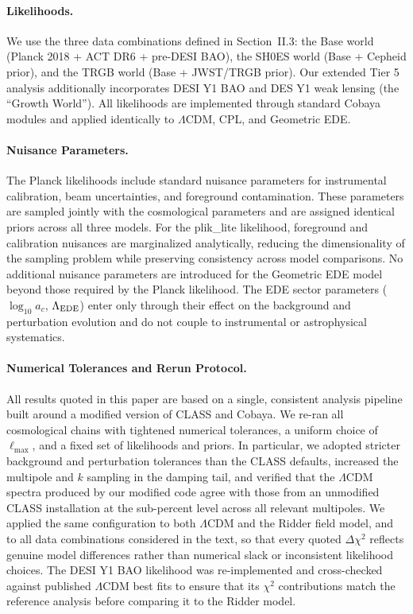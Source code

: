 \documentclass[a4paper,11pt]{article}
\begin{document}
\paragraph{Likelihoods.}
We use the three data combinations defined in Section~II.3: the Base world (Planck 2018 + ACT DR6 + pre-DESI BAO), the SH0ES world (Base + Cepheid prior), and the TRGB world (Base + JWST/TRGB prior). Our extended Tier 5 analysis additionally incorporates DESI Y1 BAO and DES Y1 weak lensing (the ``Growth World''). All likelihoods are implemented through standard Cobaya modules and applied identically to $\Lambda$CDM, CPL, and Geometric EDE.

\paragraph{Nuisance Parameters.}
The Planck likelihoods include standard nuisance parameters for instrumental calibration, beam uncertainties, and foreground contamination. These parameters are sampled jointly with the cosmological parameters and are assigned identical priors across all three models. For the plik\_lite likelihood, foreground and calibration nuisances are marginalized analytically, reducing the dimensionality of the sampling problem while preserving consistency across model comparisons. No additional nuisance parameters are introduced for the Geometric EDE model beyond those required by the Planck likelihood. The EDE sector parameters ($\log_{10}a_c$, $\Lambda_{\rm EDE}$) enter only through their effect on the background and perturbation evolution and do not couple to instrumental or astrophysical systematics.

\paragraph{Numerical Tolerances and Rerun Protocol.}
All results quoted in this paper are based on a single, consistent analysis pipeline built around a modified version of CLASS and Cobaya. We re-ran all cosmological chains with tightened numerical tolerances, a uniform choice of $\ell_{\max}$, and a fixed set of likelihoods and priors. In particular, we adopted stricter background and perturbation tolerances than the CLASS defaults, increased the multipole and $k$ sampling in the damping tail, and verified that the $\Lambda$CDM spectra produced by our modified code agree with those from an unmodified CLASS installation at the sub-percent level across all relevant multipoles. We applied the same configuration to both $\Lambda$CDM and the Ridder field model, and to all data combinations considered in the text, so that every quoted $\Delta\chi^2$ reflects genuine model differences rather than numerical slack or inconsistent likelihood choices. The DESI Y1 BAO likelihood was re-implemented and cross-checked against published $\Lambda$CDM best fits to ensure that its $\chi^2$ contributions match the reference analysis before comparing it to the Ridder model.
\end{document}
